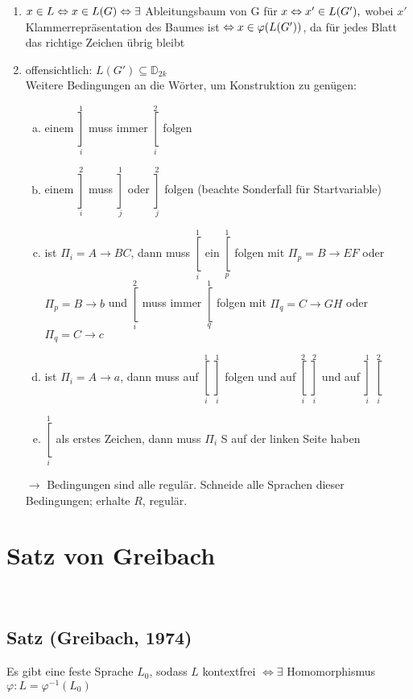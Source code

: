         \begin{enumerate}[1)]
            \item $x\in L \Leftrightarrow x\in L(G)\\\Leftrightarrow \exists$ Ableitungsbaum von G für $x\\\Leftrightarrow x'\in L(G'),$ wobei $x'$ Klammerrepräsentation des Baumes ist$\\\Leftrightarrow x\in\varphi(L(G'))$, da für jedes Blatt das richtige Zeichen übrig bleibt
            \item offensichtlich: $L(G')\subseteq\mathds{D}_{2k}$\\
            Weitere Bedingungen an die Wörter, um Konstruktion zu genügen:
            \begin{enumerate}[a)]
                \item einem $\mathop{]}\limits_i^1$ muss immer $\mathop{[}\limits_i^2$ folgen
                \item einem $\mathop{]}\limits_i^2$ muss $\mathop{]}\limits_j^1$ oder $\mathop{]}\limits_j^2$ folgen (beachte Sonderfall für Startvariable)
                \item ist $\Pi_i=A\rightarrow BC$, dann muss $\mathop{[}\limits_i^1$ ein $\mathop{[}\limits_p^1$ folgen mit $\Pi_p=B\rightarrow EF$ oder $\Pi_p=B\rightarrow b$ und $\mathop{[}\limits_i^2$ muss immer $\mathop{[}\limits_q^1$ folgen mit $\Pi_q=C\rightarrow GH$ oder $\Pi_q=C\rightarrow c$
                \item ist $\Pi_i=A\rightarrow a$, dann muss auf $\mathop{[}\limits_i^1$ $\mathop{]}\limits_i^1$ folgen und auf $\mathop{[}\limits_i^2$ $\mathop{]}\limits_i^2$ und auf $\mathop{]}\limits_i^1$ $\mathop{[}\limits_i^2$
                \item $\mathop{[}\limits_i^1$ als erstes Zeichen, dann muss $\Pi_i$ S auf der linken Seite haben
            \end{enumerate}
            \item[$\rightarrow$] Bedingungen sind alle regulär. Schneide alle Sprachen dieser Bedingungen; erhalte $R$, regulär.
        \end{enumerate}
\section{Satz von Greibach}
    \\
    \subsection{Satz (Greibach, 1974)}
        Es gibt eine feste Sprache $L_0$, sodass $L$ kontextfrei $\Leftrightarrow \exists$ Homomorphismus $\varphi: L=\varphi^{-1}(L_0)$
